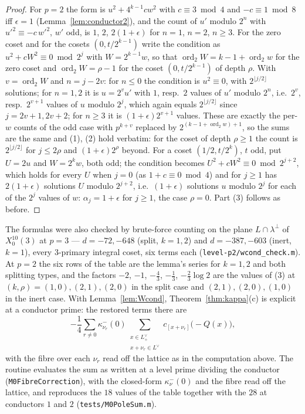 \documentclass[11pt,reqno]{amsart}
\theoremstyle{plain}
\theoremstyle{definition}
\DeclareMathOperator{\ord}{ord}
\newcommand{\Ldual}{L^{\vee}}
\newcommand{\Lp}{L_{+}}
\begin{document}
\begin{proof}
For $p=2$ the form is $u^2+4^{k-1}cw^2$ with $c\equiv3\bmod4$ and $-c\equiv1\bmod8$ iff
$\epsilon=1$ (Lemma~\ref{lem:conductor2}), and the count of $u'$ modulo $2^n$ with $u'^2\equiv
-c\,w'^2$, $w'$ odd, is $1$, $2$, $2(1+\epsilon)$ for $n=1$, $n=2$, $n\ge3$. For the zero coset
and for the cosets $(0,t/2^{k-1})$ write the condition as $u^2+cW^2\equiv0\bmod2^j$ with
$W=2^{k-1}w$, so that $\ord_2W=k-1+\ord_2w$ for the zero coset and $\ord_2W=\rho-1$ for the coset
$(0,t/2^{k-1})$ of depth $\rho$. With $v=\ord_2W$ and $n=j-2v$: for $n\le0$ the condition is
$u^2\equiv0$, with $2^{\lfloor j/2\rfloor}$ solutions; for $n=1,2$ it is $u=2^vu'$ with $1$,
resp.\ $2$ values of $u'$ modulo $2^n$, i.e.\ $2^{v}$, resp.\ $2^{v+1}$ values of $u$ modulo $2^j$,
which again equals $2^{\lfloor j/2\rfloor}$ since $j=2v+1,2v+2$; for $n\ge3$ it is $(1+\epsilon)
2^{v+1}$ values. These are exactly the per-$w$ counts of the odd case with $p^{k+v}$ replaced by
$2^{(k-1+\ord_2 w)+1}$, so the sums are the same and (1), (2) hold verbatim: for the coset of depth
$\rho\ge1$ the count is $2^{\lfloor j/2\rfloor}$ for $j\le2\rho$ and $(1+\epsilon)2^\rho$ beyond.
For a coset $(1/2,t/2^k)$, $t$ odd, put $U=2u$ and $W=2^kw$, both odd; the condition becomes
$U^2+cW^2\equiv0\bmod2^{j+2}$, which holds for every $U$ when $j=0$ (as $1+c\equiv0\bmod4$) and for
$j\ge1$ has $2(1+\epsilon)$ solutions $U$ modulo $2^{j+2}$, i.e.\ $(1+\epsilon)$ solutions $u$
modulo $2^j$ for each of the $2^j$ values of $w$: $\alpha_j=1+\epsilon$ for $j\ge1$, the case
$\rho=0$. Part (3) follows as before.
\end{proof}

The formulas were also checked by brute-force counting on the plane $L\cap\lambda^\perp$ of
$X_0^{10}(3)$ at $p=3$ --- $d=-72,-648$ (split, $k=1,2$) and $d=-387,-603$ (inert, $k=1$), every
$3$-primary integral coset, six terms each (\texttt{level-p2/wcond\_check.m}). At $p=2$ the
six rows of the table are the lemma's series for $k=1,2$ and both splitting types, and the factors
$-2$, $-1$, $-\tfrac43$, $-\tfrac13$, $-\tfrac23\log2$ are the values of (3) at
$(k,\rho)=(1,0),(2,1),(2,0)$ in the split case and $(2,1),(2,0),(1,0)$ in the inert case. With
Lemma~\ref{lem:Wcond}, Theorem~\ref{thm:kappa}(c) is explicit at a conductor prime: the restored
terms there are
\[
  -\frac14\sum_{r\neq0}\kappa^-_{\nu_r}(0)\sum_{\substack{x\in\Lp^\vee\\ x+\nu_r\in\Ldual}}
  c_{[x+\nu_r]}\bigl(-Q(x)\bigr),
\]
with the fibre over each $\nu_r$ read off the lattice as in the computation above. The routine
evaluates the sum as written at a level prime dividing the conductor (\texttt{M0FibreCorrection}),
with the closed-form $\kappa^-_\nu(0)$ and the fibre read off the lattice, and reproduces the $18$
values of the table together with the $28$ at conductors $1$ and $2$ (\texttt{tests/M0PoleSum.m}).
\end{document}
